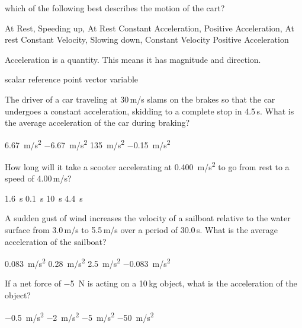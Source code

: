 \documentclass[answers]{exam}
\begin{document}
\begin{questions}
which of the following best describes the motion of the cart?

\begin{randomizechoices}
    \choice At Rest, Speeding up, At Rest
    \choice Constant Acceleration, Positive Acceleration, At rest
    \correctchoice Constant Velocity, Slowing down, Constant Velocity
    \choice Positive Acceleration
\end{randomizechoices}

\question
Acceleration is a \fillin[vector][3cm] quantity.  This means it has magnitude and direction.

\begin{randomizechoices}
    \choice scalar
    \choice reference point
    \correctchoice vector
    \choice variable
\end{randomizechoices}

\question
The driver of a car traveling at 30\,m/s slams on the brakes so that the car undergoes a constant acceleration, skidding to a complete stop in 4.5\,s. What is the average acceleration of the car during braking?

\begin{randomizechoices}
    \choice \SI{6.67}{m/s^2}
    \correctchoice \SI{-6.67}{m/s^2}
    \choice \SI{135}{m/s^2}
    \choice \SI{-0.15}{m/s^2}
\end{randomizechoices}

\question
How long will it take a scooter accelerating at \SI{0.400}{m/s^2} to go from rest to a speed of 4.00\,m/s?

\begin{randomizechoices}
    \choice \SI{1.6}{s}
    \choice \SI{0.1}{s}
    \correctchoice \SI{10}{s}
    \choice \SI{4.4}{s}
\end{randomizechoices}

\question
A sudden gust of wind increases the velocity of a sailboat relative to the water surface from 3.0\,m/s to 5.5\,m/s over a period of 30.0\,s. What is the average acceleration of the sailboat?

\begin{randomizechoices}
    \correctchoice \SI{0.083}{m/s^2}
    \choice \SI{0.28}{m/s^2}
    \choice \SI{2.5}{m/s^2}
    \choice \SI{-0.083}{m/s^2}
\end{randomizechoices}


\question
If a net force of \SI{-5}{N} is acting on a 10\,kg object, what is the acceleration of the object?

\begin{randomizechoices}
    \correctchoice \SI{-0.5}{m/s^2}
    \choice \SI{-2}{m/s^2}
    \choice \SI{-5}{m/s^2}
    \choice \SI{-50}{m/s^2}
\end{randomizechoices}


\end{questions}
\end{document}
